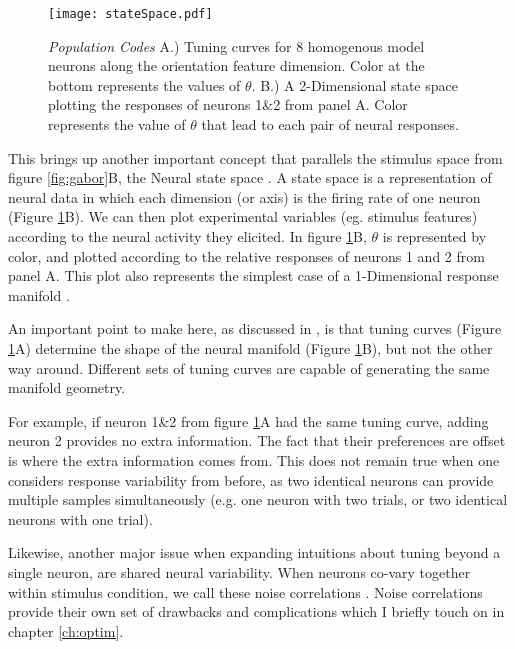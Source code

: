 \begin{figure}[h]
	\centerline{\texttt{[image: stateSpace.pdf]}}
	\caption{\textit{Population Codes} A.) Tuning curves for 8 homogenous model neurons along the orientation feature dimension. Color at the bottom represents the values of $\theta$. B.) A 2-Dimensional state space plotting the responses of neurons 1\&2 from panel A. Color represents the value of $\theta$ that lead to each pair of neural responses.  }
	\label{fig:stateSpace}
\end{figure}

This brings up another important concept that parallels the stimulus space from figure \ref{fig:gabor}B, the Neural state space \parencite{Paninski2010,Cross2021}. A state space is a representation of neural data in which each dimension (or axis) is the firing rate of one neuron (Figure \ref{fig:stateSpace}B). We can then plot experimental variables (eg. stimulus features) according to the neural activity they elicited. In figure \ref{fig:stateSpace}B, $\theta$ is represented by color, and plotted according to the relative responses of neurons 1 and 2 from panel A. This plot also represents the simplest case of a 1-Dimensional response manifold \parencite{Kriegeskorte2021, Chung2018}. 

An important point to make here, as discussed in \textcite{Kriegeskorte2021}, is that tuning curves (Figure \ref{fig:stateSpace}A) determine the shape of the neural manifold (Figure \ref{fig:stateSpace}B), but not the other way around. Different sets of tuning curves are capable of generating the same manifold geometry. 


For example, if neuron 1\&2 from figure \ref{fig:stateSpace}A had the same tuning curve, adding neuron 2 provides no extra information. The fact that their preferences are offset is where the extra information comes from. This does not remain true when one considers response variability from before, as two identical neurons can provide multiple samples simultaneously (e.g. one neuron with two trials, or two identical neurons with one trial). 

Likewise, another major issue when expanding intuitions about tuning beyond a single neuron, are shared neural variability. When neurons co-vary together within stimulus condition, we call these noise correlations \parencite{Cohen2009, Ruff2016, Snyder2014, Moreno-Bote2014}. Noise correlations provide their own set of drawbacks and complications which I briefly touch on in chapter \ref{ch:optim}.


